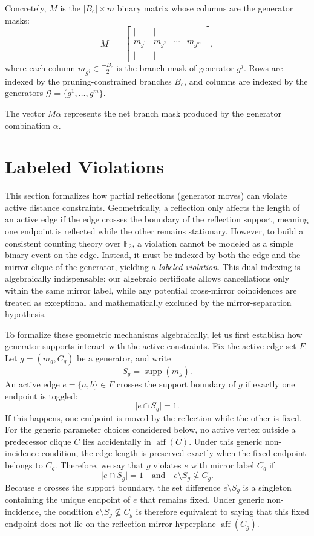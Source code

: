 \documentclass[11pt]{article}
\theoremstyle{plain}
\theoremstyle{definition}
\begin{document}
\noindent Concretely, $M$ is the $\lvert B_{\mathrm{c}}\rvert\times m$ binary matrix whose columns are the generator masks:
\[
M \;=\;
\begin{bmatrix}
  \Big| & \Big| & & \Big| \\[4pt]
  m_{g^1} & m_{g^2} & \cdots & m_{g^m} \\[4pt]
  \Big| & \Big| & & \Big|
\end{bmatrix},
\]
where each column $m_{g^j}\in\mathbb{F}_2^{B_{\mathrm{c}}}$ is the branch mask of generator $g^j$.
Rows are indexed by the pruning-constrained branches $B_{\mathrm{c}}$, and columns are indexed by the generators $\mathcal{G}=\{g^1,\ldots,g^m\}$.

The vector $M\alpha$ represents the net branch mask produced by the generator combination $\alpha$.

\section{Labeled Violations}
\label{sec:violations}

This section formalizes how partial reflections (generator moves) can violate active distance constraints. 
Geometrically, a reflection only affects the length of an active edge if the edge crosses the boundary of the reflection support, meaning one endpoint is reflected while the other remains stationary. 
However, to build a consistent counting theory over $\mathbb{F}_2$, a violation cannot be modeled as a simple binary event on the edge. 
Instead, it must be indexed by both the edge and the mirror clique of the generator, yielding a \emph{labeled violation}. 
This dual indexing is algebraically indispensable: our algebraic certificate allows cancellations only within the same mirror label, while any potential cross-mirror coincidences are treated as exceptional and mathematically excluded by the mirror-separation hypothesis.

To formalize these geometric mechanisms algebraically, let us first establish how generator supports interact with the active constraints. Fix the active edge set $F$. Let $g=(m_g, C_g)$ be a generator, and write
\[
S_g = \operatorname{supp}(m_g).
\]
An active edge $e = \{a,b\} \in F$ crosses the support boundary of $g$ if exactly one endpoint is toggled:
\[
\lvert e \cap S_g \rvert = 1.
\]
If this happens, one endpoint is moved by the reflection while the other is fixed. For the generic parameter choices considered below, no active vertex outside a predecessor clique $C$ lies accidentally in $\operatorname{aff}(C)$. Under this generic non-incidence condition, the edge length is preserved exactly when the fixed endpoint belongs to $C_g$. Therefore, we say that $g$ violates $e$ with mirror label $C_g$ if
\[
\lvert e \cap S_g \rvert = 1
\quad\text{and}\quad
e\setminus S_g \not\subseteq C_g.
\]
Because $e$ crosses the support boundary, the set difference $e \setminus S_g$ is a singleton containing the unique endpoint of $e$ that remains fixed. Under generic non-incidence, the condition $e \setminus S_g \not\subseteq C_g$ is therefore equivalent to saying that this fixed endpoint does not lie on the reflection mirror hyperplane $\operatorname{aff}(C_g)$.
\end{document}

